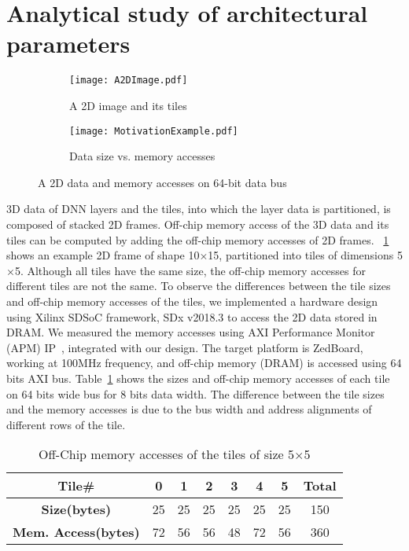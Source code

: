 \section{Analytical study of architectural parameters}\label{sec:OffChipAccessModel}
\begin{figure}[!htb]
	\centering
	\captionsetup{font=sf}
	\begin{subfigure}[t]{0.45\textwidth}
		\centering
		\texttt{[image: A2DImage.pdf]}
		\caption{A 2D image and its tiles}
		\label{fig:A2DImage}
	\end{subfigure}
	\hfil
	\begin{subfigure}[t]{0.4\textwidth}
		\centering
		\texttt{[image: MotivationExample.pdf]}
		\caption{Data size vs. memory accesses}
		\label{fig:bitPerPixelEffect}
	\end{subfigure}		
	\caption{A 2D data and memory accesses on 64-bit data bus}
	\label{fig:2DPartitionedData}
	\vspace{-1.0em}	
\end{figure}

3D data of DNN layers and the tiles, into which the layer data is partitioned, is composed of stacked 2D frames. Off-chip memory access of the 3D data and its tiles can be computed by adding the off-chip memory accesses of 2D frames. \figurename{~\ref{fig:A2DImage}} shows an example 2D frame of shape 10$\times$15, partitioned into tiles of dimensions 5$\times$5. Although all tiles have the same size, the off-chip memory accesses for different tiles are not the same. To observe the differences between the tile sizes and off-chip memory accesses of the tiles, we implemented a hardware design using Xilinx SDSoC framework, SDx v2018.3 to access the 2D data stored in DRAM. We measured the memory accesses using AXI Performance Monitor (APM) IP~\cite{APM}, integrated with our design. The target platform is ZedBoard, working at 100MHz frequency, and off-chip memory (DRAM) is accessed using 64 bits AXI bus.  Table~\ref{tab:TileOffChipAccesses} shows the sizes and off-chip memory accesses of each tile on 64 bits wide bus for 8 bits data width. The difference between the tile sizes and the memory accesses is due to the bus width and address alignments of different rows of the tile. 
\begin{table}[h]
	\centering
	\caption{Off-Chip memory accesses of the tiles of size 5$\times$5 }
	\begin{tabular}{|c|c|c|c|c|c|c|c|}
		\hline
		\textbf{Tile\#}& 0  & 1  & 2  & 3  & 4  & 5  & \textbf{Total} \\ \hline
		\textbf{Size(bytes)}& 25 & 25 & 25 & 25 & 25 & 25 & 150   \\ \hline
		\textbf{Mem. Access(bytes)} & 72 & 56 & 56 & 48 & 72 & 56 & 360  \\
		\hline
	\end{tabular}
	\label{tab:TileOffChipAccesses}
\end{table}

